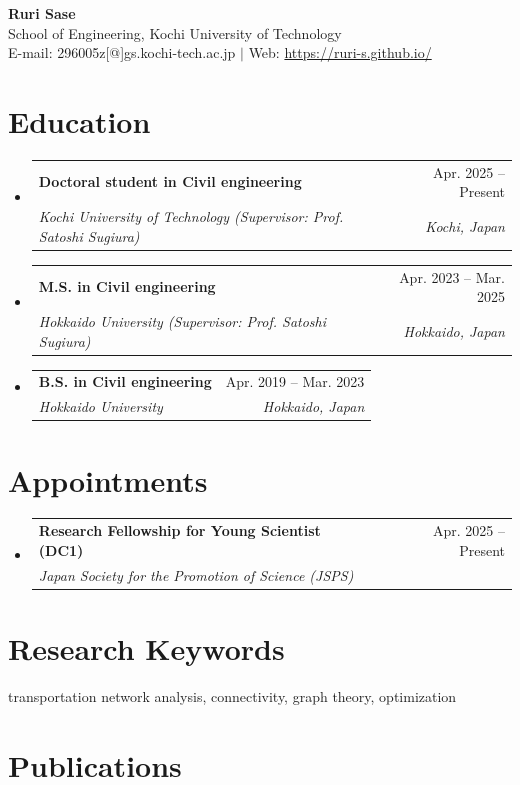 \documentclass[letterpaper,11pt]{article}
\makeatletter
\newcommand{\resumeSubheading}[4]{
  \vspace{-2pt}\item
    \begin{tabular*}{0.97\textwidth}[t]{l@{\extracolsep{\fill}}r}
      \textbf{#1} & #2 \\
      \textit{\small #3} & \textit{\small #4} \\
    \end{tabular*}\vspace{-5pt}
}
\newcommand{\resumeSubHeadingListStart}{\begin{itemize}[leftmargin=0.15in, label={}]}
\newcommand{\resumeSubHeadingListEnd}{\end{itemize}}
\makeatother
\begin{document}
\begin{center}
    {\sffamily\Huge\bfseries Ruri Sase} \\ \vspace{5pt}
    \small{School of Engineering, Kochi University of Technology} \\
    \small{E-mail: 296005z[@]gs.kochi-tech.ac.jp $|$ Web: \href{https://ruri-s.github.io/}{\color{blue}https://ruri-s.github.io/}}
\end{center}

\section{Education}
\resumeSubHeadingListStart
    \resumeSubheading
      {Doctoral student in Civil engineering}{Apr. 2025 -- Present}
      {Kochi University of Technology (Supervisor: Prof. Satoshi Sugiura)}{Kochi, Japan}
    \resumeSubheading
      {M.S. in Civil engineering}{Apr. 2023 -- Mar. 2025}
      {Hokkaido University (Supervisor: Prof. Satoshi Sugiura)}{Hokkaido, Japan}
    \resumeSubheading
      {B.S. in Civil engineering}{Apr. 2019 -- Mar. 2023}
      {Hokkaido University}{Hokkaido, Japan}
\resumeSubHeadingListEnd

\section{Appointments}
\resumeSubHeadingListStart
    \resumeSubheading
      {Research Fellowship for Young Scientist (DC1)}{Apr. 2025 -- Present}
      {Japan Society for the Promotion of Science (JSPS)}{}
\resumeSubHeadingListEnd

\section{Research Keywords}
\begin{itemize}[leftmargin=0.15in, label={}]
    \small{\item{
    transportation network analysis, connectivity, graph theory, optimization
    }}
\end{itemize}

\section{Publications}
\end{document}
